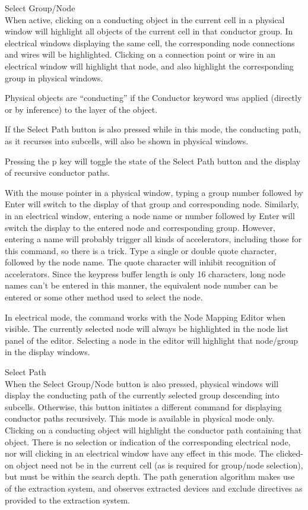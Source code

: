 \begin{description}
\item{\cb Select Group/Node}\\
When active, clicking on a conducting object in the current cell in a
physical window will highlight all objects of the current cell in that
conductor group.  In electrical windows displaying the same cell, the
corresponding node connections and wires will be highlighted. 
Clicking on a connection point or wire in an electrical window will
highlight that node, and also highlight the corresponding group in
physical windows.

Physical objects are ``conducting'' if the {\vt Conductor} keyword was
applied (directly or by inference) to the layer of the object.

If the {\cb Select Path} button is also pressed while in this mode,
the conducting path, as it recurses into subcells, will also be shown
in physical windows.

Pressing the {\kb p} key will toggle the state of the {\cb Select
Path} button and the display of recursive conductor paths.

With the mouse pointer in a physical window, typing a group number
followed by {\kb Enter} will switch to the display of that group and
corresponding node.  Similarly, in an electrical window, entering a
node name or number followed by {\kb Enter} will switch the display to
the entered node and corresponding group.  However, entering a name
will probably trigger all kinds of accelerators, including those for
this command, so there is a trick.  Type a single or double quote
character, followed by the node name.  The quote character will
inhibit recognition of accelerators.  Since the keypress buffer length
is only 16 characters, long node names can't be entered in this
manner, the equivalent node number can be entered or some other method
used to select the node.

In electrical mode, the command works with the {\cb Node Mapping
Editor} when visible.  The currently selected node will always be
highlighted in the node list panel of the editor.  Selecting a node in
the editor will highlight that node/group in the display windows.

\item{\cb Select Path}\\
When the {\cb Select Group/Node} button is also pressed, physical
windows will display the conducting path of the currently selected
group descending into subcells.  Otherwise, this button initiates a
different command for displaying conductor paths recursively.  This
mode is available in physical mode only.  Clicking on a conducting
object will highlight the conductor path containing that object. 
There is no selection or indication of the corresponding electrical
node, nor will clicking in an electrical window have any effect in
this mode.  The clicked-on object need not be in the current cell (as
is required for group/node selection), but must be within the search
depth.  The path generation algorithm makes use of the extraction
system, and observes extracted devices and exclude directives as
provided to the extraction system.


\end{description}
